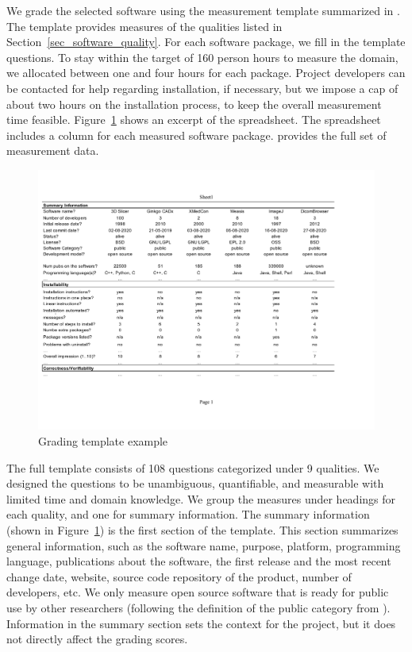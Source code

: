 \documentclass[11pt]{article}
\begin{document}
We grade the selected software using the measurement template summarized in
\citet{SmithEtAl2021}.  The template provides measures of the qualities listed
in Section~\ref{sec_software_quality}.
For each software package, we fill in the template questions. To stay within the
target of 160 person hours to measure the domain, we allocated between one and
four hours for each package. Project developers can be contacted for help
regarding installation, if necessary, but we impose a cap of about two hours on
the installation process, to keep the overall measurement time feasible.
Figure~\ref{fg_grading_template_example} shows an excerpt of the spreadsheet.
The spreadsheet includes a column for each measured software package. \citep{Dong2021-Data} provides the full set of measurement data.

\begin{figure}[!ht]
\includegraphics[scale=0.66]{template.pdf}
\caption{Grading template example}
\label{fg_grading_template_example}
\end{figure}

The full template consists of 108 questions categorized under 9 qualities.  We
designed the questions to be unambiguous, quantifiable, and measurable with
limited time and domain knowledge. We group the measures under headings for each
quality, and one for summary information. The summary information (shown in
Figure~\ref{fg_grading_template_example}) is the first section of the template.
This section summarizes general information, such as the software name, purpose,
platform, programming language, publications about the software, the first
release and the most recent change date, website, source code repository of the
product, number of developers, etc.  We only measure open source software that
is ready for public use by other researchers (following the definition of the
public category from \citep{GewaltigAndCannon2012}). Information in the summary
section sets the context for the project, but it does not directly affect the
grading scores.
\end{document}
